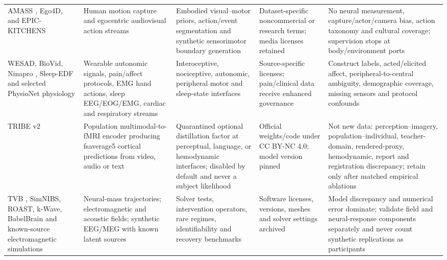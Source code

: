 \begin{table}[!h]
\begin{tabularx}{\textwidth}{@{}p{}p{}p{}p{}X@{}}
AMASS \citep{mahmood2019amass}, Ego4D, and EPIC-KITCHENS &
Human motion capture and egocentric audiovisual action streams &
Embodied visual--motor priors, action/event segmentation and synthetic
sensorimotor boundary generation &
Dataset-specific noncommercial or research terms; media licenses retained &
No neural measurement, capture/actor/camera bias, action taxonomy and
cultural coverage; supervision stops at body/environment ports\\

WESAD, BioVid, Ninapro \citep{atzori2014ninapro}, Sleep-EDF and selected
PhysioNet physiology &
Wearable autonomic signals, pain/affect protocols, EMG hand actions, sleep
EEG/EOG/EMG, cardiac and respiratory streams &
Interoceptive, nociceptive, autonomic, peripheral motor and sleep-state
interfaces &
Source-specific licenses; pain/clinical data receive enhanced governance &
Construct labels, acted/elicited affect, peripheral-to-central ambiguity,
demographic coverage, missing sensors and protocol confounds\\

TRIBE v2 \citep{dascoli2026tribe} &
Population multimodal-to-fMRI encoder producing fsaverage5 cortical
predictions from video, audio or text &
Quarantined optional distillation factor at perceptual, language, or
hemodynamic interfaces; disabled by default and never a subject likelihood &
Official weights/code under CC BY-NC 4.0; model version pinned &
Not new data: perception--imagery, population--individual, teacher-domain,
rendered-proxy, hemodynamic, report and registration discrepancy; retain only
after matched empirical ablations\\

TVB \citep{sanz2013}, SimNIBS, ROAST, k-Wave, BabelBrain and known-source
electromagnetic simulations &
Neural-mass trajectories; electromagnetic and acoustic fields; synthetic
EEG/MEG with known latent sources &
Solver tests, intervention operators, rare regimes, identifiability and
recovery benchmarks &
Software licenses, versions, meshes and solver settings archived &
Model discrepancy and numerical error dominate; validate field and
neural-response components separately and never count synthetic replications
as participants\\


\end{tabularx}
\end{table}
